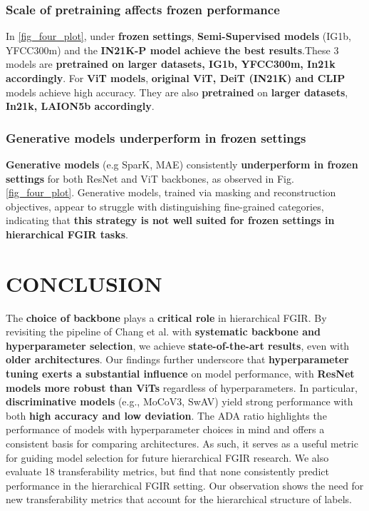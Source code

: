 \documentclass[sigconf, screen, review, anonymous]{acmart}
\begin{document}
\subsubsection{Scale of pretraining affects frozen performance}
In \ref{fig_four_plot}, under \textbf{frozen settings}, \textbf{Semi-Supervised models} (IG1b, YFCC300m) and the \textbf{IN21K-P model achieve the best results}.These 3 models are \textbf{pretrained on larger datasets, IG1b, YFCC300m, In21k accordingly}. For \textbf{ViT models}, \textbf{original ViT, DeiT (IN21K) and CLIP} models achieve high accuracy. They are also \textbf{pretrained} on \textbf{larger datasets}, \textbf{In21k, LAION5b accordingly}.

\subsubsection{Generative models underperform in frozen settings}
\textbf{Generative models} (e.g SparK, MAE) consistently \textbf{underperform in frozen settings} for both ResNet and ViT backbones, as observed in Fig. \ref{fig_four_plot}. Generative models, trained via masking and reconstruction objectives, appear to struggle with distinguishing fine-grained categories, indicating that \textbf{this strategy is not well suited for frozen settings in hierarchical FGIR tasks}.

\section{CONCLUSION}
The \textbf{choice of backbone} plays a \textbf{critical role} in hierarchical FGIR. By revisiting the pipeline of Chang et al. \cite{chang_your_2021} with \textbf{systematic backbone and hyperparameter selection}, we achieve \textbf{state-of-the-art results}, even with \textbf{older architectures}. Our findings further underscore that \textbf{hyperparameter tuning exerts a substantial influence} on model performance, with \textbf{ResNet models more robust than ViTs} regardless of hyperparameters. In particular, \textbf{discriminative models} (e.g., MoCoV3, SwAV) yield strong performance with both \textbf{high accuracy and low deviation}. The ADA ratio highlights the performance of models with hyperparameter choices in mind and offers a consistent basis for comparing architectures. As such, it serves as a useful metric for guiding model selection for future hierarchical FGIR research. We also evaluate 18 transferability metrics, but find that none consistently predict performance in the hierarchical FGIR setting. Our observation shows the need for new transferability metrics that account for the hierarchical structure of labels.



\end{document}

